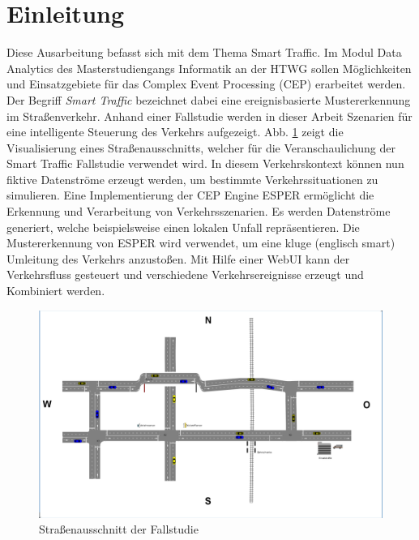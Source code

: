 \section{Einleitung}

Diese Ausarbeitung befasst sich mit dem Thema Smart Traffic. Im Modul Data Analytics des Masterstudiengangs Informatik an der HTWG sollen Möglichkeiten und Einsatzgebiete für das Complex Event Processing (CEP)  erarbeitet werden. Der Begriff \emph{Smart Traffic} bezeichnet dabei eine ereignisbasierte Mustererkennung im Straßenverkehr. Anhand einer Fallstudie werden in dieser Arbeit Szenarien für eine intelligente Steuerung des Verkehrs aufgezeigt. Abb. \ref{fig1} zeigt die Visualisierung  eines Straßenausschnitts, welcher für die Veranschaulichung der Smart Traffic Fallstudie verwendet wird. In diesem Verkehrskontext können nun fiktive Datenströme erzeugt werden, um bestimmte Verkehrssituationen zu simulieren. Eine Implementierung der CEP Engine ESPER ermöglicht die Erkennung und Verarbeitung von Verkehrsszenarien. Es werden Datenströme generiert, welche beispielsweise einen lokalen Unfall  repräsentieren. Die Mustererkennung von ESPER wird verwendet, um eine kluge (englisch smart) Umleitung des Verkehrs anzustoßen. Mit Hilfe einer WebUI kann der Verkehrsfluss gesteuert und verschiedene Verkehrsereignisse erzeugt und Kombiniert werden.

\begin{figure}[ht]
	\includegraphics[width=\textwidth]{images/1_InitialStreetMap_Final.png}
	\caption{Straßenausschnitt der Fallstudie}
	\label{fig1}
\end{figure}




